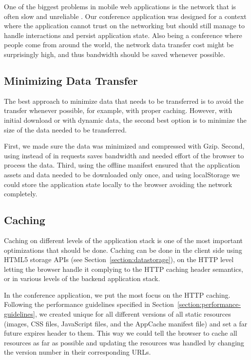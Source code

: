 One of the biggest problems in mobile web applications is the network
that is often slow and unreliable \cite{zandy2002reliable}. Our
conference application was designed for a context where the
application cannot trust on the networking but should still manage to
handle interactions and persist application state. Also being a
conference where people come from around the world, the network data
transfer cost might be surprisingly high, and thus bandwidth should be
saved whenever possible.

\subsection{Minimizing Data Transfer}

The best approach to minimize data that needs to be transferred is to
avoid the transfer whenever possible, for example, with proper
caching. However, with initial download or with dynamic data, the
second best option is to minimize the size of the data needed to be
transferred.

First, we made sure the data was minimized and compressed with
Gzip. Second, using  instead of  in 
requests saves bandwidth \cite{charland2011mobile} and needed effort
of the browser to process the data. Third, using the offline manifest
ensured that the application assets and data needed to be downloaded
only once, and using localStorage we could store the application state
locally to the browser avoiding the network completely.

\subsection{Caching}

Caching on different levels of the application stack is one of the
most important optimizations that should be done. Caching can be done
in the client side using HTML5 storage APIs (see
Section~\ref{section:datastorage}), on the HTTP level letting the
browser handle it complying to the HTTP caching header semantics, or
in various levels of the backend application stack.

In the conference application, we put the most focus on the HTTP
caching. Following the performance guidelines specified in
Section~\ref{section:performance-guidelines}, we created unique
 for all different versions of all static resources
(images, CSS files, JavaScript files, and the AppCache manifest file)
and set a far future expires header to them. This way we could tell
the browser to cache all resources as far as possible and updating the
resources was handled by changing the version number in their
corresponding URLs.

